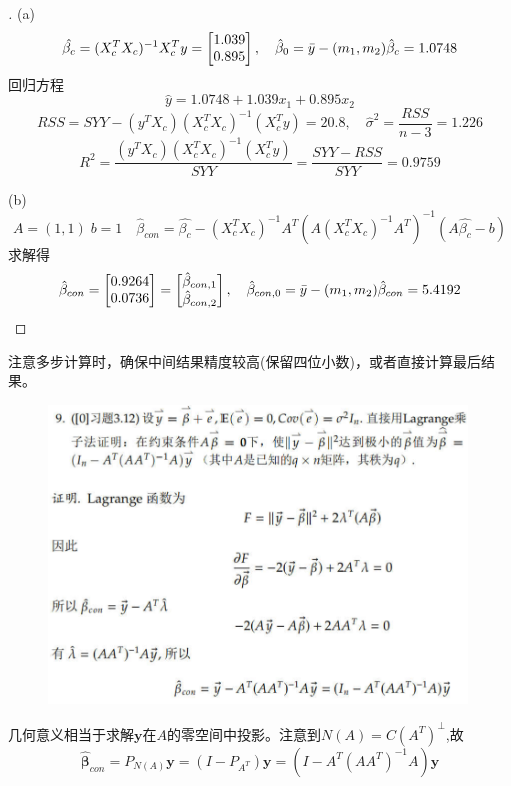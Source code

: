 \documentclass[cn,hazy,green,12pt,normal]{elegantnote}
\numberwithin{equation}{section}
\numberwithin{subsection}{section}
\begin{document}
\begin{proof}[\solutionname]
(a) \[
\hat{\beta_c}=(X_c^TX_c)^{-1}X_c^Ty = \begin{bmatrix}
    1.039\\
    0.895\\ \end{bmatrix},\quad \hat{\beta}_0=\Bar{y}-(m_1, m_2)\hat{\beta}_c=1.0748
    \]
    回归方程
    \[\hat{y}=1.0748+1.039x_1+0.895x_2\]
    \[RSS = SYY-(y^TX_c)(X_c^TX_c)^{-1}(X_c^Ty) = 20.8, \quad \hat{\sigma}^2 = \frac{RSS}{n-3}=1.226\] 
\[R^2 = \dfrac{(y^TX_c)(X_c^TX_c)^{-1}(X_c^Ty)}{SYY} = \dfrac{SYY-RSS}{SYY}=0.9759\]

\noindent (b)
\[A = (1, 1)\; b = 1 \quad \hat{\beta}_{con}=\hat{\beta_c}-(X_c^TX_c)^{-1}A^T(A(X_c^TX_c)^{-1}A^T)^{-1}(A\hat{\beta_c}-b)\]
求解得
\[\hat{\beta}_{con} = \begin{bmatrix}
    0.9264\\
    0.0736\\
\end{bmatrix}=\begin{bmatrix}
    \hat{\beta}_{con,1}\\
    \hat{\beta}_{con,2}
\end{bmatrix},\quad \hat{\beta}_{con,0} = \Bar{y}-(m_1, m_2)\hat{\beta}_{con}=5.4192\]

\end{proof}


\begin{note}
    注意多步计算时，确保中间结果精度较高(保留四位小数)，或者直接计算最后结果。
\end{note}
\newpage
\begin{homework}
\end{homework}
        \begin{figure}[!htbp]
        \centering
        \includegraphics[width=30em]{image/ex2_plt13.png}
    \end{figure}

\begin{note}
    几何意义相当于求解$\bm y$在$A$的零空间中投影。注意到$N(A)=C(A^T)^{\perp}$,故
    \[\hat{\bm \beta}_{con} = P_{N(A)} \bm y=(I-P_{A^T})\bm y=(I-A^T(AA^T)^{-1}A)\bm y\]
\end{note}
\end{document}
